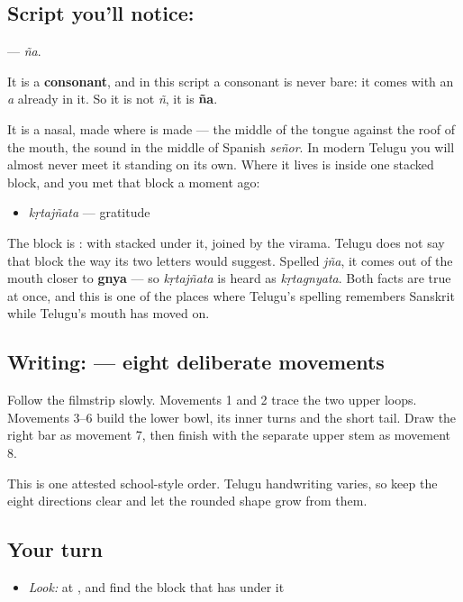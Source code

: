 \subsection*{Script you'll notice: }
\textbf{} — \emph{ña}.

It is a \textbf{consonant}, and in this script a consonant is never bare: it comes with an \emph{a} already in it. So it is not \emph{ñ}, it is \textbf{ña}.

It is a nasal, made where \textbf{} is made — the middle of the tongue against the roof of the mouth, the sound in the middle of Spanish \emph{señor}. In modern Telugu you will almost never meet it standing on its own. Where it lives is inside one stacked block, and you met that block a moment ago:

\begin{itemize}
\raggedright
  \item \textbf{} \emph{kṛtajñata} — gratitude
\end{itemize}

The block is \textbf{}: \textbf{} with \textbf{} stacked under it, joined by the virama. Telugu does not say that block the way its two letters would suggest. Spelled \emph{jña}, it comes out of the mouth closer to \textbf{gnya} — so \emph{kṛtajñata} is heard as \emph{kṛtagnyata}. Both facts are true at once, and this is one of the places where Telugu's spelling remembers Sanskrit while Telugu's mouth has moved on.

\subsection*{Writing:  — eight deliberate movements}

Follow the filmstrip slowly. Movements 1 and 2 trace the two upper loops. Movements 3–6 build the lower bowl, its inner turns and the short tail. Draw the right bar as movement 7, then finish with the separate upper stem as movement 8.

This is one attested school-style order. Telugu handwriting varies, so keep the eight directions clear and let the rounded shape grow from them.

\subsection*{Your turn}
\begin{itemize}
\raggedright
  \item \emph{Look:} at , and find the block that has  under it
\end{itemize}

